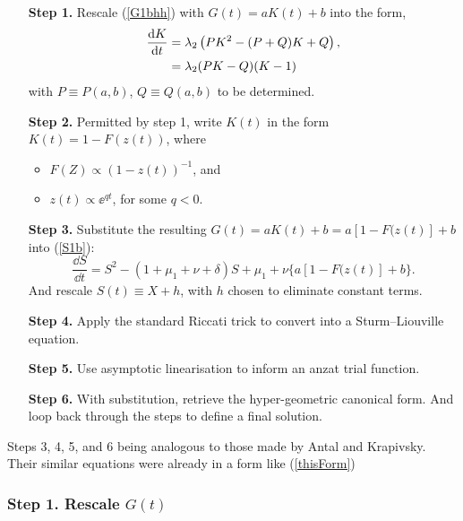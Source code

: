 \begin{adjustwidth}{1cm}{}
\begin{itemize}
\item[\textbf{Step 1.}] Rescale (\ref{G1bhh}) with $G(t) = a K(t) + b$ into the form, 
\begin{align}
\displaystyle\frac{{\rm d} K}{{\rm d} t} &= \lambda_2 \left( P K^2 - (P+Q)K + Q\right), \nonumber\\
&= \lambda_2(PK-Q)(K-1) \label{thisForm}
\end{align}
with $P\equiv P(a,b)$, $Q\equiv Q(a,b)$ to be determined. \\

\item[\textbf{Step 2.}] Permitted by step 1, write $K(t)$ in the form $K(t) = 1 - F(z(t))$, where
\begin{itemize}
\item $F(Z) \propto (1-z(t))^{-1}$, and 
\item $z(t)\propto \ee^{qt}$, for some $q < 0$.\\
\end{itemize}

\item[\textbf{Step 3.}] Substitute the resulting $G(t) = aK(t) + b = a[1 - F(z(t)] + b$ into (\ref{S1b}):
$$\frac{\dd S}{\dd  t} = S^2 - (1 + \mu_1 + \nu + \delta) S + \mu_1 + \nu \{ a[1 - F(z(t)] + b\}.$$
And rescale $S(t)\equiv X + h$, with $h$ chosen to eliminate constant terms. \\

\item[\textbf{Step 4.}] Apply the standard Riccati trick to convert into a Sturm–Liouville equation. \\

\item[\textbf{Step 5.}] Use asymptotic linearisation to inform an anzat trial function.\\

 \item[\textbf{Step 6.}] With substitution, retrieve the hyper-geometric canonical form. And loop back through the steps to define a final solution. \\
\end{itemize}
\end{adjustwidth}

\noindent
Steps 3, 4, 5, and 6 being analogous to those made by Antal and Krapivsky. Their similar equations were already in a form like (\ref{thisForm})

\subsubsection{Step 1. Rescale $G(t)$}


